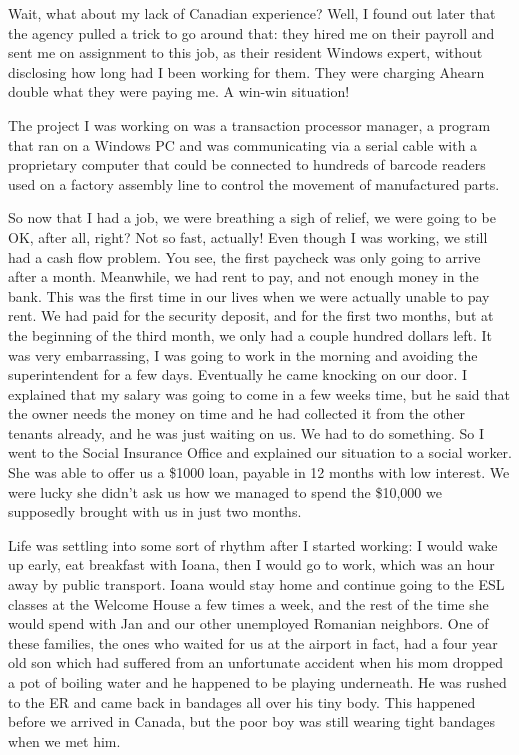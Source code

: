 \documentclass[12pt]{book}
\begin{document}
Wait, what about my lack of Canadian experience? Well, I found out later
that the agency pulled a trick to go around that: they hired me on their
payroll and sent me on assignment to this job, as their resident Windows
expert, without disclosing how long had I been working for them. They
were charging Ahearn double what they were paying me. A win-win
situation!

The project I was working on was a transaction processor manager, a
program that ran on a Windows PC and was communicating via a serial
cable with a proprietary computer that could be connected to hundreds of
barcode readers used on a factory assembly line to control the movement
of manufactured parts.

So now that I had a job, we were breathing a sigh of relief, we were
going to be OK, after all, right? Not so fast, actually! Even though I
was working, we still had a cash flow problem. You see, the first
paycheck was only going to arrive after a month. Meanwhile, we had rent
to pay, and not enough money in the bank. This was the first time in our
lives when we were actually unable to pay rent. We had paid for the
security deposit, and for the first two months, but at the beginning of
the third month, we only had a couple hundred dollars left. It was very
embarrassing, I was going to work in the morning and avoiding the
superintendent for a few days. Eventually he came knocking on our door.
I explained that my salary was going to come in a few weeks time, but he
said that the owner needs the money on time and he had collected it from
the other tenants already, and he was just waiting on us. We had to do
something. So I went to the Social Insurance Office and explained our
situation to a social worker. She was able to offer us a \$1000 loan,
payable in 12 months with low interest. We were lucky she didn't ask us
how we managed to spend the \$10,000 we supposedly brought with us in
just two months.

Life was settling into some sort of rhythm after I started working: I
would wake up early, eat breakfast with Ioana, then I would go to work,
which was an hour away by public transport. Ioana would stay home and
continue going to the ESL classes at the Welcome House a few times a
week, and the rest of the time she would spend with Jan and our other
unemployed Romanian neighbors. One of these families, the ones who
waited for us at the airport in fact, had a four year old son which had
suffered from an unfortunate accident when his mom dropped a pot of
boiling water and he happened to be playing underneath. He was rushed to
the ER and came back in bandages all over his tiny body. This happened
before we arrived in Canada, but the poor boy was still wearing tight
bandages when we met him.
\end{document}
